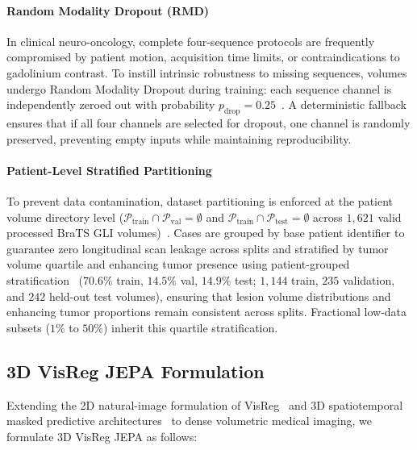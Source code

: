 \documentclass{article}
\begin{document}
\paragraph{Random Modality Dropout (RMD)}
In clinical neuro-oncology, complete four-sequence protocols are frequently compromised by patient motion, acquisition time limits, or contraindications to gadolinium contrast. To instill intrinsic robustness to missing sequences, volumes undergo Random Modality Dropout during training: each sequence channel is independently zeroed out with probability $p_{\text{drop}} = 0.25$~\citep{havaei2016hemis}. A deterministic fallback ensures that if all four channels are selected for dropout, one channel is randomly preserved, preventing empty inputs while maintaining reproducibility.

\paragraph{Patient-Level Stratified Partitioning}
To prevent data contamination, dataset partitioning is enforced at the patient volume directory level ($\mathcal{P}_{\text{train}} \cap \mathcal{P}_{\text{val}} = \emptyset$ and $\mathcal{P}_{\text{train}} \cap \mathcal{P}_{\text{test}} = \emptyset$ across $1,621$ valid processed BraTS GLI volumes)~\citep{brats2024}. Cases are grouped by base patient identifier to guarantee zero longitudinal scan leakage across splits and stratified by tumor volume quartile and enhancing tumor presence using patient-grouped stratification~\citep{pedregosa2011scikit} ($70.6\%$ train, $14.5\%$ val, $14.9\%$ test; $1,144$ train, $235$ validation, and $242$ held-out test volumes), ensuring that lesion volume distributions and enhancing tumor proportions remain consistent across splits. Fractional low-data subsets ($1\%$ to $50\%$) inherit this quartile stratification.

\subsection{3D VisReg JEPA Formulation}
\label{sec:visreg_formulation}
Extending the 2D natural-image formulation of VisReg~\citep{wu2026visreg} and 3D spatiotemporal masked predictive architectures~\citep{assran2023ijepa,bardes2024vjepa,hatamizadeh2022unetr} to dense volumetric medical imaging, we formulate 3D VisReg JEPA as follows:
\end{document}
